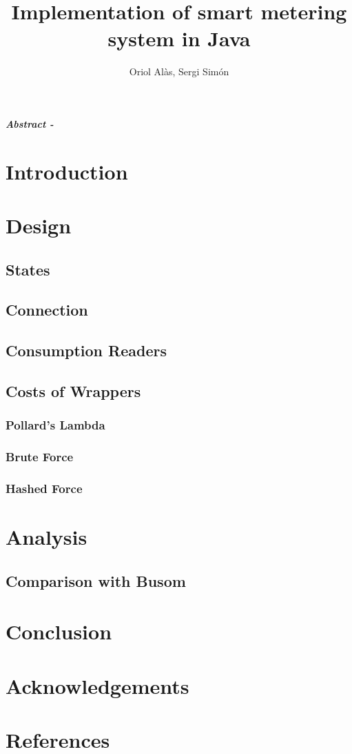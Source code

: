 \documentclass{article}
\title{Implementation of smart metering system in Java}
\author{Oriol Alàs, Sergi Simón}
\begin{document}
   \maketitle
   
   \textbf{\textit{Abstract - }}
   \section{Introduction}
   
   \section{Design}
   
   \subsection{States}
   
   \subsection{Connection}
   
   \subsection{Consumption Readers}
   
   \subsection{Costs of Wrappers}
   \subsubsection{Pollard's Lambda}
   \subsubsection{Brute Force}
   \subsubsection{Hashed Force}
   \section{Analysis}
   \subsection{Comparison with Busom}
   \section{Conclusion}
   \section{Acknowledgements}
   \section{References}
\end{document}
